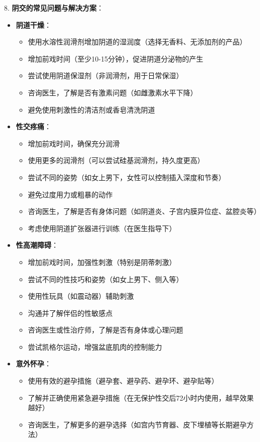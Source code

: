 \documentclass[12pt,UTF8]{ctexbook}
\begin{document}
8. \textbf{阴交的常见问题与解决方案}：
\begin{itemize}
	\item \textbf{阴道干燥}：
	\begin{itemize}
		\item 使用水溶性润滑剂增加阴道的湿润度（选择无香料、无添加剂的产品）
		\item 增加前戏时间（至少10-15分钟），促进阴道分泌物的产生
		\item 尝试使用阴道保湿剂（非润滑剂，用于日常保湿）
		\item 咨询医生，了解是否有激素问题（如雌激素水平下降）
		\item 避免使用刺激性的清洁剂或香皂清洗阴道
	\end{itemize}
	\item \textbf{性交疼痛}：
	\begin{itemize}
		\item 增加前戏时间，确保充分润滑
		\item 使用更多的润滑剂（可以尝试硅基润滑剂，持久度更高）
		\item 尝试不同的姿势（如女上男下，女性可以控制插入深度和节奏）
		\item 避免过度用力或粗暴的动作
		\item 咨询医生，了解是否有身体问题（如阴道炎、子宫内膜异位症、盆腔炎等）
		\item 考虑使用阴道扩张器进行训练（在医生指导下）
	\end{itemize}
	\item \textbf{性高潮障碍}：
	\begin{itemize}
		\item 增加前戏时间，加强性刺激（特别是阴蒂刺激）
		\item 尝试不同的性技巧和姿势（如女上男下、侧入等）
		\item 使用性玩具（如震动器）辅助刺激
		\item 沟通并了解伴侣的性敏感点
		\item 咨询医生或性治疗师，了解是否有身体或心理问题
		\item 尝试凯格尔运动，增强盆底肌肉的控制能力
	\end{itemize}
	\item \textbf{意外怀孕}：
	\begin{itemize}
		\item 使用有效的避孕措施（避孕套、避孕药、避孕环、避孕贴等）
		\item 了解并正确使用紧急避孕措施（在无保护性交后72小时内使用，越早效果越好）
		\item 咨询医生，了解更多的避孕选择（如宫内节育器、皮下埋植等长期避孕方法）

\end{itemize}
\end{itemize}
\end{document}
